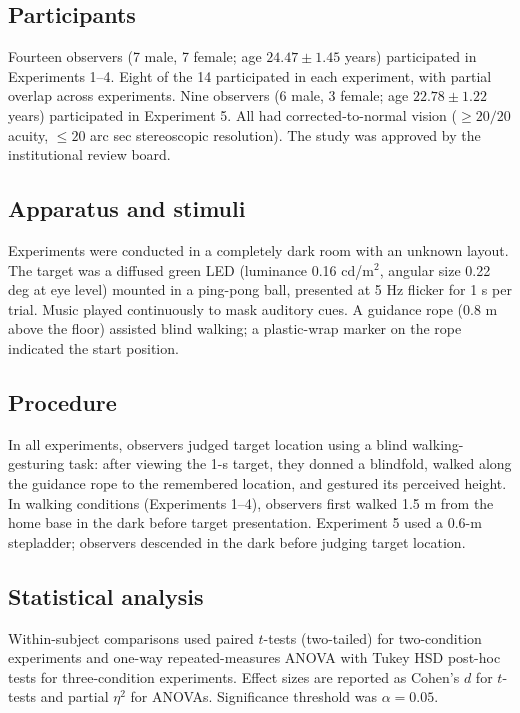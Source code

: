 \documentclass[11pt]{article}
\begin{document}
\subsection{Participants}

Fourteen observers (7 male, 7 female; age $24.47 \pm 1.45$ years) participated in Experiments 1--4. Eight of the 14 participated in each experiment, with partial overlap across experiments. Nine observers (6 male, 3 female; age $22.78 \pm 1.22$ years) participated in Experiment 5. All had corrected-to-normal vision ($\geq 20/20$ acuity, $\leq 20$ arc sec stereoscopic resolution). The study was approved by the institutional review board.

\subsection{Apparatus and stimuli}

Experiments were conducted in a completely dark room with an unknown layout. The target was a diffused green LED (luminance 0.16 cd/m$^2$, angular size 0.22 deg at eye level) mounted in a ping-pong ball, presented at 5 Hz flicker for 1 s per trial. Music played continuously to mask auditory cues. A guidance rope (0.8 m above the floor) assisted blind walking; a plastic-wrap marker on the rope indicated the start position.

\subsection{Procedure}

In all experiments, observers judged target location using a blind walking-gesturing task: after viewing the 1-s target, they donned a blindfold, walked along the guidance rope to the remembered location, and gestured its perceived height. In walking conditions (Experiments 1--4), observers first walked 1.5 m from the home base in the dark before target presentation. Experiment 5 used a 0.6-m stepladder; observers descended in the dark before judging target location.

\subsection{Statistical analysis}

Within-subject comparisons used paired $t$-tests (two-tailed) for two-condition experiments and one-way repeated-measures ANOVA with Tukey HSD post-hoc tests for three-condition experiments. Effect sizes are reported as Cohen's $d$ for $t$-tests and partial $\eta^2$ for ANOVAs. Significance threshold was $\alpha = 0.05$.
\end{document}
